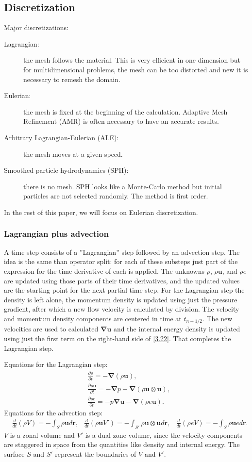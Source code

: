 \documentclass[letterpaper]{report}
\newcommand\bn{\boldsymbol{\nabla}}
\newcommand\br{\mathbf{r}}
\newcommand\bs{\boldsymbol}
\renewcommand{\(}{\left(}
\renewcommand{\)}{\right)}
\renewcommand{\[}{\left[}
\renewcommand{\]}{\right]}
\begin{document}
\subsection{Discretization}
Major discretizations:
\begin{description}
  \item[Lagrangian:] the mesh follows the material. This is very efficient in
  one dimension but for multidimensional problems, the mesh can be too
  distorted and new it is necessary to remesh the domain.
  \item[Eulerian:] the mesh is fixed at the beginning of the calculation.
  Adaptive Mesh Refinement (AMR) is often necessary to have an accurate
  results.
  \item[Arbitrary Lagrangian-Eulerian (ALE):] the mesh moves at a given speed.
  \item[Smoothed particle hydrodynamics (SPH):] there is no mesh. SPH looks
  like a Monte-Carlo method but initial particles are not selected randomly.
  The method is first order.
\end{description}
In the rest of this paper, we will focus on Eulerian discretization.
\subsubsection{Lagrangian plus advection}
A time step consists of a ''Lagrangian'' step followed by an advection step.
The idea is the same than operator split: for each of these substeps just part
of the expression for the time derivative of each  is applied. The unknowns
$\rho$, $\rho\bs{u}$, and $\rho e$ are updated using those parts of their time
derivatives, and the updated values are the starting point for the next
partial time step. For the Lagrangian step the density is left alone, the
momentum density is updated using just the pressure gradient, after which a
new flow velocity is calculated by division. The velocity and momentum density
components are centered in time at $t_{n+1/2}$. The new velocities are used to
calculated $\bn\bs{u}$ and the internal energy density is updated using just
the first term on the right-hand side of \cref{3.22}. That completes the
Lagrangian step.

Equations for the Lagrangian step:
\begin{align}
  &\frac{\partial \rho}{\partial t} = -\bn (\rho \bs{u}),\\
  &\frac{\partial \rho \bs{u}}{\partial t} = -\bn p - \bn(\rho
  \bs{u}\otimes\bs{u}),\\
  &\frac{\partial \rho e}{\partial t} = -p\bn\bs{u} - \bn (\rho e \bs{u})
  \label{3.22}.
\end{align}
Equations for the advection step:
\begin{align}
  &\frac{d}{dt}(\rho V) = -\int_S \rho \bs{u}d\br,
  &\frac{d}{dt}(\rho \bs{u}V') = -\int_{S'} \rho \bs{u}\otimes\bs{u} d\br,
  &\frac{d}{dt}(\rho e V) = -\int_S \rho \bs{u}e d\br.
\end{align}
$V$ is a zonal volume and $V'$ is a dual zone volume, since the velocity
components are staggered in space from the quantities like density and
internal energy. The surface $S$ and $S'$ represent the boundaries of $V$ and
$V'$.
\end{document}
